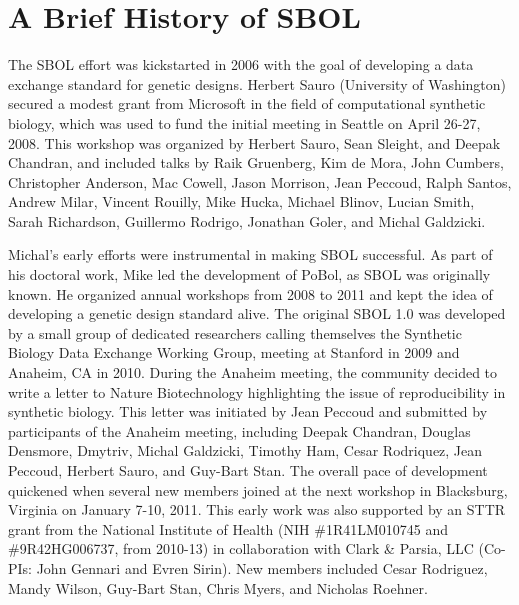\section{A Brief History of SBOL}

The SBOL effort was kickstarted in 2006 with the goal of developing a data exchange standard for genetic designs. Herbert Sauro (University of Washington) secured a modest grant from Microsoft in the field of computational synthetic biology, which was used to fund the initial meeting in Seattle on April 26-27, 2008. This workshop was organized by Herbert Sauro, Sean Sleight, and Deepak Chandran, and included talks by Raik Gruenberg, Kim de Mora, John Cumbers,  Christopher Anderson, Mac Cowell, Jason Morrison, Jean Peccoud, Ralph Santos, Andrew Milar, Vincent Rouilly, Mike Hucka, Michael Blinov, Lucian Smith, Sarah Richardson, Guillermo Rodrigo, Jonathan Goler, and Michal Galdzicki. 


Michal's early efforts were instrumental in making SBOL successful. As part of his doctoral work, Mike led the development of PoBol, as SBOL was originally known. He organized annual workshops from 2008 to 2011 and kept the idea of developing a genetic design standard alive. The original SBOL 1.0 was developed by a small group of dedicated researchers calling themselves the Synthetic Biology Data Exchange Working Group, meeting at Stanford in 2009 and Anaheim, CA in 2010.  During the Anaheim meeting, the community decided to write a letter to Nature Biotechnology highlighting the issue of reproducibility in synthetic biology. This letter was initiated by Jean Peccoud and submitted by participants of the Anaheim meeting, including Deepak Chandran, Douglas Densmore, Dmytriv, Michal Galdzicki, Timothy Ham, Cesar Rodriquez, Jean Peccoud, Herbert Sauro, and Guy-Bart Stan. The overall pace of development quickened when several new members joined at the next workshop in Blacksburg, Virginia on January 7-10, 2011. This early work was also supported by an STTR grant from the National Institute of Health (NIH \#1R41LM010745 and \#9R42HG006737, from 2010-13) in collaboration with Clark \& Parsia, LLC (Co-PIs: John Gennari and Evren Sirin). New members included Cesar Rodriguez, Mandy Wilson, Guy-Bart Stan, Chris Myers, and Nicholas Roehner.

